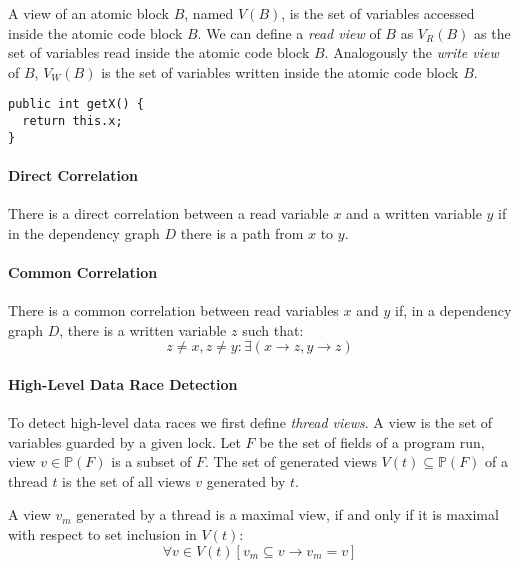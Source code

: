 A view of an atomic block $B$, named $V(B)$, is the set of variables accessed inside the atomic code block $B$.
We can define a \textit{read view} of $B$ as $V_{R}(B)$ as the set of variables read inside the atomic code block $B$.
Analogously the \textit{write view} of $B$, $V_{W}(B)$ is the set of variables written inside the atomic code block $B$.

\begin{lstlisting}[caption={
  The \texttt{getX} has the read view $V_{R}(\mathtt{getX}) = \{\mathtt{x}\}$ and the write view $V_{W}(\mathtt{getX}) = \{\}$.
}]
public int getX() {
  return this.x;
}
\end{lstlisting}

\paragraph{Direct Correlation}
There is a direct correlation between a read variable $x$ and a written variable $y$ if in the dependency graph $D$ there is a path from $x$ to $y$.

\paragraph{Common Correlation}
There is a common correlation between read variables $x$ and $y$ if,
in a dependency graph $D$, there is a written variable $z$ such that:
\begin{equation*}
  z \neq x, z \neq y : \exists \left(x \rightarrow z, y \rightarrow z\right)
\end{equation*}

\paragraph{High-Level Data Race Detection}
To detect high-level data races we first define \textit{thread views}.
A view is the set of variables guarded by a given lock.
Let $\mathit{F}$ be the set of fields of a program run,
view $v \in \mathbb{P}(\mathit{F})$ is a subset of $\mathit{F}$.
The set of generated views $V(t) \subseteq \mathbb{P}(\mathit{F})$ of a thread $t$ is the set of all views $v$ generated by $t$.

A view $v_m$ generated by a thread is a maximal view, if and only if it is maximal with respect to set inclusion in $V(t)$:
\begin{equation*}
  \forall v \in V(t)[v_m \subseteq v \rightarrow v_m = v]
\end{equation*}

